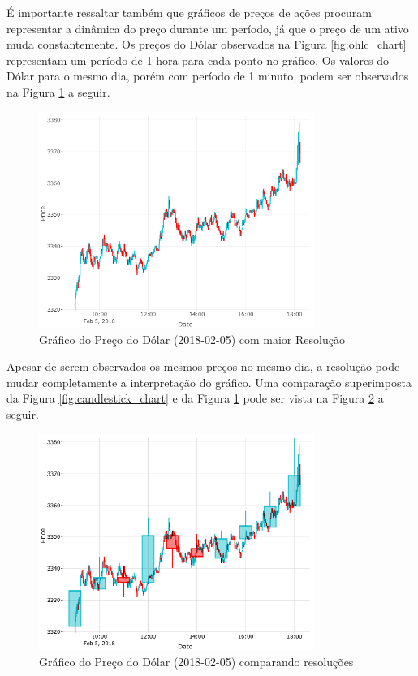 \documentclass[12pt]{article}
\begin{document}
É importante ressaltar também que gráficos de preços de ações procuram representar a dinâmica 
do preço durante um período, já que o preço de um ativo muda constantemente. Os preços do Dólar
observados na Figura \ref{fig:ohlc_chart} representam um período de 1 hora para cada ponto
no gráfico. Os valores do Dólar para o mesmo dia, porém com período de 1 minuto, podem ser
observados na Figura \ref{fig:ohlc_chart_detailed} a seguir.

\begin{figure}[H]
	\centering
	\includegraphics[width=0.8\textwidth]{ohlc_chart_detailed.png}
	\caption{Gráfico do Preço do Dólar (2018-02-05) com maior Resolução}
	\label{fig:ohlc_chart_detailed}
\end{figure}

Apesar de serem observados os mesmos preços no mesmo dia, a resolução pode mudar completamente
a interpretação do gráfico. Uma comparação superimposta da Figura \ref{fig:candlestick_chart}
e da Figura \ref{fig:ohlc_chart_detailed} pode ser vista na
Figura \ref{fig:ohlc_chart_detailed_superimposed} a seguir.

\begin{figure}[H]
	\centering
	\includegraphics[width=0.8\textwidth]{ohlc_chart_detailed_superimposed.png}
	\caption{Gráfico do Preço do Dólar (2018-02-05) comparando resoluções}
	\label{fig:ohlc_chart_detailed_superimposed}
\end{figure}
\end{document}
